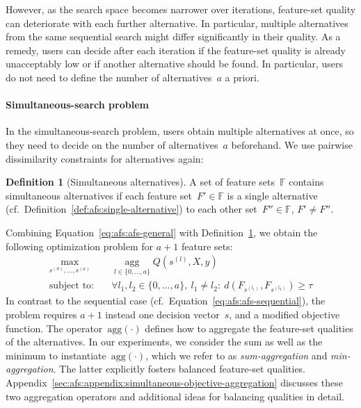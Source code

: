 \documentclass{article}
\theoremstyle{definition}
\newtheorem{definition}{Definition}
\begin{document}
However, as the search space becomes narrower over iterations, feature-set quality can deteriorate with each further alternative.
In particular, multiple alternatives from the same sequential search might differ significantly in their quality.
As a remedy, users can decide after each iteration if the feature-set quality is already unacceptably low or if another alternative should be found.
In particular, users do not need to define the number of alternatives~$a$ a priori.

\paragraph{Simultaneous-search problem}

In the simultaneous-search problem, users obtain multiple alternatives at once, so they need to decide on the number of alternatives~$a$ beforehand.
We use pairwise dissimilarity constraints for alternatives again:
%
\begin{definition}[Simultaneous alternatives]
	A set of feature sets~$\mathbb{F}$ contains simultaneous alternatives if each feature set~$F' \in \mathbb{F}$ is a single alternative (cf.~Definition~\ref{def:afs:single-alternative}) to each other set~$F'' \in \mathbb{F}$, $F' \neq F''$.
	\label{def:afs:simultaneous-alternative}
\end{definition}
%
Combining Equation~\ref{eq:afs:afs-general} with Definition~\ref{def:afs:simultaneous-alternative}, we obtain the following optimization problem for $a+1$ feature sets:
%
\begin{equation}
	\begin{aligned}
		\max_{s^{(0)}, \dots, s^{(a)}} &\quad \operatorname*{agg}_{l \in \{0, \dots, a\}} Q(s^{(l)},X,y) \\
		\text{subject to:} &\quad \forall l_1, l_2 \in \{0, \dots, a\},~l_1 \neq l_2:~d(F_{s^{(l_1)}},F_{s^{(l_2)}}) \geq \tau
	\end{aligned}
	\label{eq:afs:afs-simultaneous}
\end{equation}
%
In contrast to the sequential case (cf.~Equation~\ref{eq:afs:afs-sequential}), the problem requires $a+1$ instead one decision vector~$s$, and a modified objective function.
The operator~$\text{agg}(\cdot)$ defines how to aggregate the feature-set qualities of the alternatives.
In our experiments, we consider the sum as well as the minimum to instantiate~$\text{agg}(\cdot)$, which we refer to as \emph{sum-aggregation} and \emph{min-aggregation}.
The latter explicitly fosters balanced feature-set qualities.
Appendix~\ref{sec:afs:appendix:simultaneous-objective-aggregation} discusses these two aggregation operators and additional ideas for balancing qualities in detail.
\end{document}
